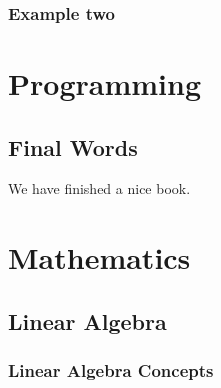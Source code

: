 \documentclass[]{book}
\begin{document}
\hypertarget{example-two}{%
\section{Example two}\label{example-two}}

\hypertarget{part-programming}{%
\part{Programming}\label{part-programming}}

\hypertarget{final-words}{%
\chapter{Final Words}\label{final-words}}

We have finished a nice book.

\hypertarget{part-mathematics}{%
\part{Mathematics}\label{part-mathematics}}

\hypertarget{linear-algebra}{%
\chapter{Linear Algebra}\label{linear-algebra}}

\hypertarget{linear-algebra-concepts}{%
\section{Linear Algebra Concepts}\label{linear-algebra-concepts}}

\newcommand{\rv}[1]{#1}
\newcommand{\rve}[1]{\mathbf{#1}}
\newcommand{\gp}{w}
\newcommand{\gpt}{\text{GP}}
\newcommand{\mgp}{\mathbf{w}}
\newcommand{\mgpt}{\text{MGP}}

\newcommand{\ve}[1]{\mathbf{#1}}
\newcommand{\vet}[1]{\mathbf{#1}}
\newcommand{\m}[1]{\mathbf{#1}}

\newcommand{\abs}[1]{\left| #1 \right|}
\newcommand{\tr}{\intercal}
\newcommand{\norm}[1]{\left\lVert#1\right\rVert}
\newcommand{\normsq}[1]{\left\lVert#1\right\rVert^2}
\newcommand{\diag}[1]{\text{diag}(#1)}
\newcommand{\trace}[1]{\text{tr}\left(#1\right)}
\newcommand{\cross}[2][]{#2^\tr\ifthenelse{\isempty{#1}}{#2}{{#1}}}
\newcommand{\tcross}[1]{#1#1^\tr}
\newcommand{\mve}[1]{\text{vec}({#1})}

\newcommand{\ind}[1]{\mathds{1}_{\left(#1\right)}}
\DeclareMathOperator*{\argmin}{arg\,min}
\end{document}
